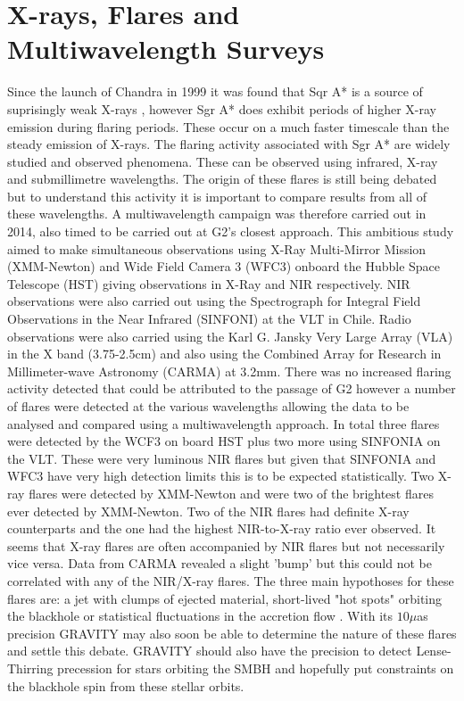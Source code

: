 \documentclass[a4paper,12pt]{article}
\begin{document}
\section{X-rays, Flares and Multiwavelength Surveys}
Since the launch of Chandra in 1999 it was found that Sqr A* is a source of suprisingly weak X-rays \citep{falke1}, however Sgr A* does exhibit periods of higher X-ray emission during flaring periods.
These occur on a much faster timescale than the steady emission of X-rays.
The flaring activity associated with Sgr A* are widely studied and observed phenomena. These can be observed using infrared, X-ray and submillimetre wavelengths. The origin of these flares is still
being debated but to understand this activity it is important to compare results from all of these wavelengths. A multiwavelength campaign \citep{mossoux} was therefore carried out in 2014, also timed
to be carried out at G2's closest approach.
This ambitious study aimed to make simultaneous observations using X-Ray Multi-Mirror Mission (XMM-Newton) and Wide Field Camera 3 (WFC3) onboard the Hubble Space Telescope (HST) giving observations in 
X-Ray 
and
NIR respectively. NIR observations were also carried out using the Spectrograph for Integral Field Observations in the Near Infrared (SINFONI) at the VLT in Chile. 
Radio observations were also carried using the Karl G. Jansky Very Large Array (VLA) in the X band (3.75-2.5cm) 
and also using the Combined Array for Research in Millimeter-wave Astronomy (CARMA) at 3.2mm. There was no increased flaring activity detected that could be attributed to the passage of G2 however a 
number of
 flares
were detected at the various wavelengths allowing the data to be analysed and compared using a multiwavelength approach. 
In total three flares were detected by the WCF3 on board HST plus two more using SINFONIA on the VLT. These were very luminous NIR flares but given that SINFONIA and WFC3 have very high detection limits 
this
is to be expected statistically. Two X-ray flares were detected by XMM-Newton and were two of the brightest flares ever detected by XMM-Newton. Two of the NIR flares had definite X-ray counterparts
and the one had the highest NIR-to-X-ray ratio ever observed. It seems that X-ray flares are often accompanied by NIR flares but not necessarily vice versa. Data from CARMA revealed a slight 
'bump' but this could not be correlated with any of the NIR/X-ray flares. 
The three main hypothoses for these flares are: a jet with clumps of ejected material, short-lived "hot spots" orbiting the blackhole or statistical fluctuations in the accretion flow \citep{goddi}.
With its $10\mu$as precision GRAVITY may also soon be able to determine the nature of these flares and settle this debate. GRAVITY should also have the precision to detect Lense-Thirring precession
for stars orbiting the SMBH and hopefully put constraints on the blackhole spin from these stellar orbits.
\end{document}
